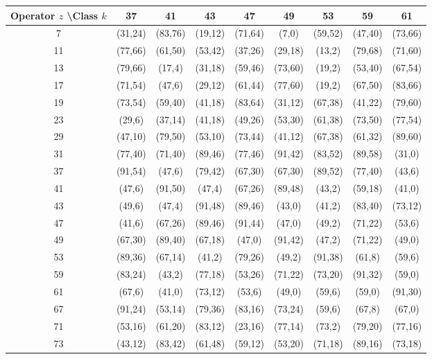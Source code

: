\documentclass[11pt,a4paper]{article}
\begin{document}
\begin{table}[htbp]
\centering
\tiny
\begin{tabular}{c|cccccccc}
Operator \(z\) \textbackslash Class \(k\) & 37 & 41 & 43 & 47 & 49 & 53 & 59 & 61 \\
\hline
7  & (31,24) & (83,76) & (19,12) & (71,64) & (7,0) & (59,52) & (47,40) & (73,66) \\
11 & (77,66) & (61,50) & (53,42) & (37,26) & (29,18) & (13,2) & (79,68) & (71,60) \\
13 & (79,66) & (17,4) & (31,18) & (59,46) & (73,60) & (19,2) & (53,40) & (67,54) \\
17 & (71,54) & (47,6) & (29,12) & (61,44) & (77,60) & (19,2) & (67,50) & (83,66) \\
19 & (73,54) & (59,40) & (41,18) & (83,64) & (31,12) & (67,38) & (41,22) & (79,60) \\
23 & (29,6) & (37,14) & (41,18) & (49,26) & (53,30) & (61,38) & (73,50) & (77,54) \\
29 & (47,10) & (79,50) & (53,10) & (73,44) & (41,12) & (67,38) & (61,32) & (89,60) \\
31 & (77,40) & (71,40) & (89,46) & (77,46) & (91,42) & (83,52) & (89,58) & (31,0) \\
37 & (91,54) & (47,6) & (79,42) & (67,30) & (67,30) & (89,52) & (77,40) & (43,6) \\
41 & (47,6) & (91,50) & (47,4) & (67,26) & (89,48) & (43,2) & (59,18) & (41,0) \\
43 & (49,6) & (47,4) & (91,48) & (89,46) & (43,0) & (41,2) & (83,40) & (73,12) \\
47 & (41,6) & (67,26) & (89,46) & (91,44) & (47,0) & (49,2) & (71,22) & (53,6) \\
49 & (67,30) & (89,40) & (67,18) & (47,0) & (91,42) & (47,2) & (71,22) & (49,0) \\
53 & (89,36) & (67,14) & (41,2) & (79,26) & (49,2) & (91,38) & (61,8) & (59,6) \\
59 & (83,24) & (43,2) & (77,18) & (53,26) & (71,22) & (73,20) & (91,32) & (59,0) \\
61 & (67,6) & (41,0) & (73,12) & (53,6) & (49,0) & (59,6) & (59,0) & (91,30) \\
67 & (91,24) & (53,14) & (79,36) & (83,16) & (73,24) & (59,6) & (67,8) & (67,0) \\
71 & (53,16) & (61,20) & (83,12) & (23,16) & (77,14) & (73,2) & (79,20) & (77,16) \\
73 & (43,12) & (83,42) & (61,48) & (59,12) & (53,20) & (71,18) & (89,16) & (73,18) \\

\end{tabular}
\end{table}
\end{document}
